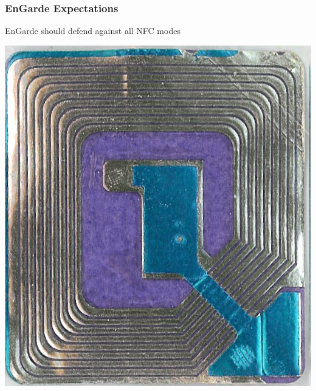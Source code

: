 \documentclass[unknownkeysallowed]{beamer}
\begin{document}
\begin{frame}
\frametitle{EnGarde Expectations}
  \begin{center}

    \begin{block}{EnGarde should defend against all NFC modes}
      \begin{center}

        \includegraphics[width=\linewidth,height=0.3\textheight,keepaspectratio]{figures/wikimediatag.jpg}

\end{center}
\end{block}
\end{center}
\end{frame}
\end{document}
